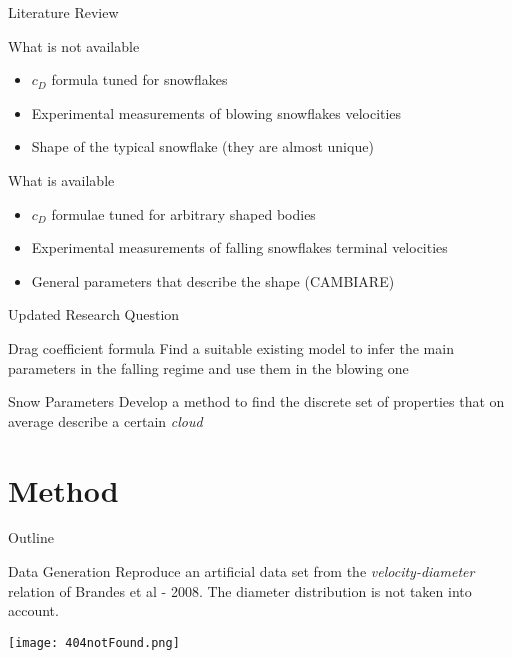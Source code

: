\documentclass{beamer}
\begin{document}
    \begin{frame}{Literature Review}
    	\begin{alertblock}{What is not available}
    		\begin{itemize}
    			\item $ c_D $ formula tuned for snowflakes
    			\item Experimental measurements of blowing snowflakes velocities
    			\item Shape of the typical snowflake (they are almost unique)
    		\end{itemize}
    	\end{alertblock}
    
		\begin{exampleblock}{What is available}
			\begin{itemize}
				\item $ c_D $ formulae tuned for arbitrary shaped bodies
				\item Experimental measurements of falling snowflakes terminal velocities
				\item General parameters that describe the shape (CAMBIARE)
			\end{itemize}
		\end{exampleblock}
    \end{frame}

    \begin{frame}{Updated Research Question}
		\begin{block}{Drag coefficient formula}
			Find a suitable existing model to infer the main parameters in the falling regime and use them in the blowing one
		\end{block}
	
		\begin{block}{Snow Parameters}
			Develop a method to find the discrete set of properties that on average describe a certain \textit{cloud}
		\end{block}
	\end{frame}
    
\section{Method}
    \begin{frame}{Outline}
    	\tableofcontents[currentsection]
    \end{frame}
    
    \begin{frame}{Data Generation}
		Reproduce an artificial data set from the \textit{velocity-diameter} relation of Brandes et al - 2008. The diameter distribution is not taken into account.
		
		\centering
		\texttt{[image: 404notFound.png]}
    \end{frame}
\end{document}
